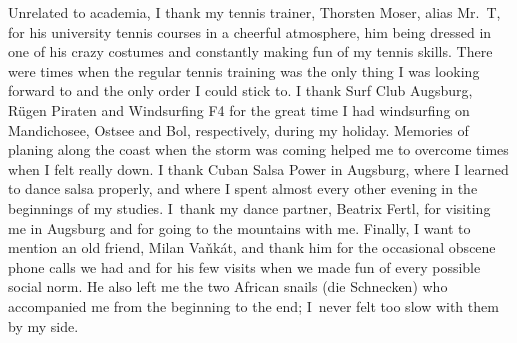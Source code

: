 \documentclass[\MainFolder/Text.tex]{subfiles}
\begin{document}
Unrelated to academia, I thank my tennis trainer, Thorsten Moser, alias Mr.~T, for his university tennis courses in a cheerful atmosphere, him being dressed in one of his crazy costumes and constantly making fun of my tennis skills. There were times when the regular tennis training was the only thing I was looking forward to and the only order I could stick to. I thank Surf Club Augsburg, R\"ugen Piraten and Windsurfing F4 for the great time I had windsurfing on Mandichosee, Ostsee and Bol, respectively, during my holiday. Memories of planing along the coast when the storm was coming helped me to overcome times when I felt really down. I thank Cuban Salsa Power in Augsburg, where I learned to dance salsa properly, and where I spent almost every other evening in the beginnings of my studies. I~thank my dance partner, Beatrix Fertl, for visiting me in Augsburg and for going to the mountains with me. Finally, I want to mention an old friend, Milan Va\v nk\'at, and thank him for the occasional obscene phone calls we had and for his few visits when we made fun of every possible social norm. He also left me the two African snails (die Schnecken) who accompanied me from the beginning to the end; I~never felt too slow with them by my side.

%

\end{document}
